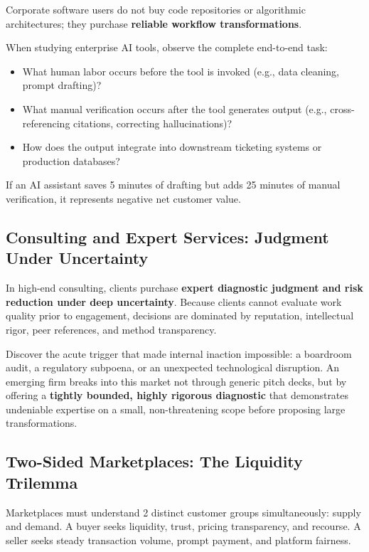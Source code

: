 Corporate software users do not buy code repositories or algorithmic architectures; they purchase \textbf{reliable workflow transformations}.

When studying enterprise AI tools, observe the complete end-to-end task:
\begin{itemize}[leftmargin=1.2em,itemsep=0.2ex]
  \item What human labor occurs before the tool is invoked (e.g., data cleaning, prompt drafting)?
  \item What manual verification occurs after the tool generates output (e.g., cross-referencing citations, correcting hallucinations)?
  \item How does the output integrate into downstream ticketing systems or production databases?
\end{itemize}
If an AI assistant saves 5 minutes of drafting but adds 25 minutes of manual verification, it represents negative net customer value.

\subsection{Consulting and Expert Services: Judgment Under Uncertainty}

In high-end consulting, clients purchase \textbf{expert diagnostic judgment and risk reduction under deep uncertainty}. Because clients cannot evaluate work quality prior to engagement, decisions are dominated by reputation, intellectual rigor, peer references, and method transparency.

Discover the acute trigger that made internal inaction impossible: a boardroom audit, a regulatory subpoena, or an unexpected technological disruption. An emerging firm breaks into this market not through generic pitch decks, but by offering a \textbf{tightly bounded, highly rigorous diagnostic} that demonstrates undeniable expertise on a small, non-threatening scope before proposing large transformations.

\subsection{Two-Sided Marketplaces: The Liquidity Trilemma}

Marketplaces must understand 2 distinct customer groups simultaneously: supply and demand. A buyer seeks liquidity, trust, pricing transparency, and recourse. A seller seeks steady transaction volume, prompt payment, and platform fairness.

